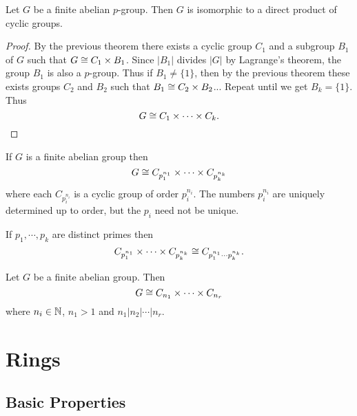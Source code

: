 \documentclass[11pt]{article}
\begin{document}
\begin{proposition}
    Let $G$ be a finite abelian $p$-group. Then $G$ is isomorphic to a direct product of cyclic groups.
\end{proposition}

\begin{proof}
    By the previous theorem there exists a cyclic group $C_1$ and a subgroup $B_1$ of $G$ such that $G\cong C_1\times B_1$. Since $|B_1|$ divides $|G|$ by Lagrange's theorem, the group $B_1$ is also a $p$-group. Thus if $B_1\neq\{1\}$, then by the previous theorem these exists groups $C_2$ and $B_2$ such that $B_1\cong C_2\times B_2$... Repeat until we get $B_k=\{1\}$. Thus
    \[G\cong C_1\times\cdots\times C_k.\]
\end{proof}

\begin{theorem}
    If $G$ is a finite abelian group then
    \[G\cong C_{p_1^{n_1}}\times\cdots\times C_{p_k^{n_k}}\]
    where each $C_{p_i^{n_i}}$ is a cyclic group of order $p_i^{n_i}$. The numbers $p_i^{n_i}$ are uniquely determined up to order, but the $p_i$ need not be unique.
\end{theorem}

\begin{note}
    If $p_1,\cdots,p_k$ are distinct primes then
    \[C_{p_1^{n_1}}\times\cdots\times C_{p_k^{n_k}}\cong C_{p_1^{n_1}\cdots p_k^{n_k}}.\]
\end{note}

\begin{proposition}
    Let $G$ be a finite abelian group. Then
    \[G\cong C_{n_1}\times\cdots\times C_{n_r}\]
    where $n_i\in\mathbb{N}$, $n_1>1$ and $n_1|n_2|\cdots|n_r$.
\end{proposition}

\section{Rings}

\subsection{Basic Properties}
\end{document}

